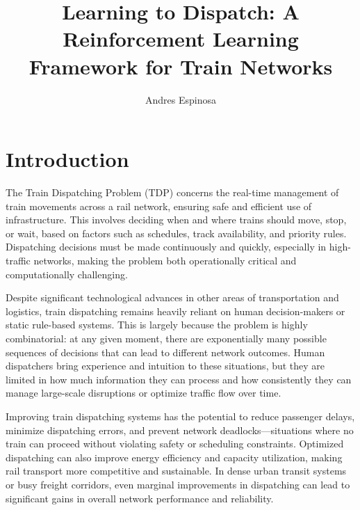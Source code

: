 \documentclass[runningheads]{llncs}
\begin{document}
\title{Learning to Dispatch: A Reinforcement Learning Framework for Train Networks}

\author{\textcolor{uf_blue}{Andres Espinosa}}
\maketitle


\begin{abstract}

\end{abstract}



\section{Introduction}
\label{sse:introduction}

The Train Dispatching Problem (TDP) concerns the real-time management of train movements across a rail network, ensuring safe and efficient use of infrastructure. 
This involves deciding when and where trains should move, stop, or wait, based on factors such as schedules, track availability, and priority rules. 
Dispatching decisions must be made continuously and quickly, especially in high-traffic networks, making the problem both operationally critical and computationally challenging.

Despite significant technological advances in other areas of transportation and logistics, train dispatching remains heavily reliant on human decision-makers or static rule-based systems. 
This is largely because the problem is highly combinatorial: at any given moment, there are exponentially many possible sequences of decisions that can lead to different network outcomes. 
Human dispatchers bring experience and intuition to these situations, but they are limited in how much information they can process and how consistently they can manage large-scale disruptions or optimize traffic flow over time.

Improving train dispatching systems has the potential to reduce passenger delays, minimize dispatching errors, and prevent network deadlocks—situations where no train can proceed without violating safety or scheduling constraints. 
Optimized dispatching can also improve energy efficiency and capacity utilization, making rail transport more competitive and sustainable. 
In dense urban transit systems or busy freight corridors, even marginal improvements in dispatching can lead to significant gains in overall network performance and reliability.
\end{document}
